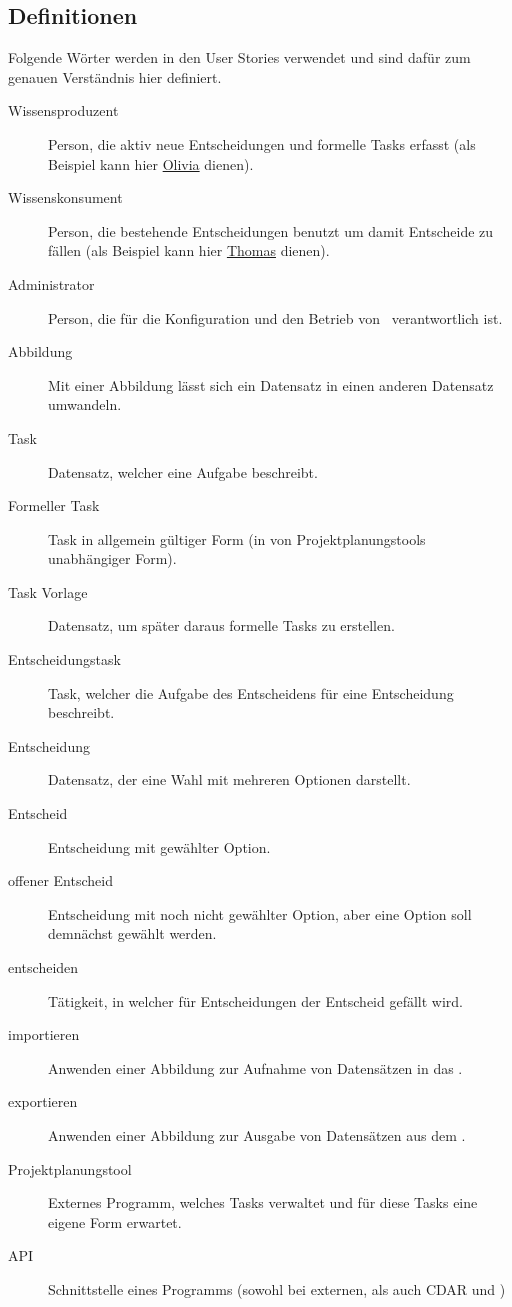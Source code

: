 	\subsection{Definitionen}\label{userstoryDefinitions}
		Folgende Wörter werden in den User Stories verwendet und sind dafür zum genauen Verständnis hier definiert.
		\begin{description}
			\item[Wissensproduzent] Person, die aktiv neue Entscheidungen und formelle Tasks erfasst (als Beispiel kann hier \hyperref[olivia]{Olivia} dienen).
			\item[Wissenskonsument] Person, die bestehende Entscheidungen benutzt um damit Entscheide zu fällen (als Beispiel kann hier \hyperref[thomas]{Thomas} dienen).
			\item[Administrator] Person, die für die Konfiguration und den Betrieb von \eeppi\ verantwortlich ist.
			\item[Abbildung] Mit einer Abbildung lässt sich ein Datensatz in einen anderen Datensatz umwandeln.
			\item[Task] Datensatz, welcher eine Aufgabe beschreibt.
			\item[Formeller Task] Task in allgemein gültiger Form (in von Projektplanungstools unabhängiger Form).
			\item[Task Vorlage] Datensatz, um später daraus formelle Tasks zu erstellen.
			\item[Entscheidungstask] Task, welcher die Aufgabe des Entscheidens für eine Entscheidung beschreibt.
			\item[Entscheidung] Datensatz, der eine Wahl mit mehreren Optionen darstellt.
			\item[Entscheid] Entscheidung mit gewählter Option.
			\item[offener Entscheid] Entscheidung mit noch nicht gewählter Option, aber eine Option soll demnächst gewählt werden.
			\item[entscheiden] Tätigkeit, in welcher für Entscheidungen der Entscheid gefällt wird.
			\item[importieren] Anwenden einer Abbildung zur Aufnahme von Datensätzen in das \eeppi.
			\item[exportieren] Anwenden einer Abbildung zur Ausgabe von Datensätzen aus dem \eeppi.
			\item[Projektplanungstool] Externes Programm, welches Tasks verwaltet und für diese Tasks eine eigene Form erwartet.
			\item[API] Schnittstelle eines Programms (sowohl bei externen, als auch CDAR und \eeppi)
		\end{description}

